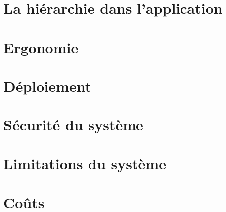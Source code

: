         \section{La hiérarchie dans l'application}
        \lipsum[1]
        \section{Ergonomie}
        \lipsum[1]
        \section{Déploiement}
        \lipsum[1]
        \section{Sécurité du système}
        \lipsum[1]
        \section{Limitations du système}
        \lipsum[1]
        \section{Coûts}
        \lipsum[1]
    
